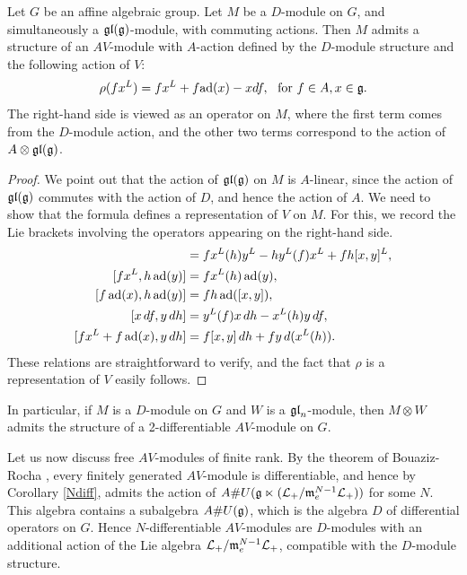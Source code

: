 \documentclass[12pt]{amsart}
\begin{document}

\begin{theorem}
[ChatGPT]
\label{twodiff}
Let $G$ be an affine algebraic group. Let $M$ be a $D$-module on $G$, and simultaneously a $\mathfrak{gl}(\mathfrak{g})$-module, with commuting actions. Then $M$ admits a structure of an $AV$-module with $A$-action defined by the $D$-module structure and the following action of $V$:
$$\rho(f x^L) = f x^L + f \ad(x) - x df, \ \ \text{for } f \in A, x \in \g.$$
The right-hand side is viewed as an operator on $M$, where the first term comes from the $D$-module action, and the other two terms correspond to the action of $A \otimes \mathfrak{gl}(\mathfrak{g})$.
\end{theorem}
\begin{proof}
We point out that the action of $\mathfrak{gl}(\mathfrak{g})$ on $M$ is $A$-linear, since the action of $\mathfrak{gl}(\mathfrak{g})$ commutes with the action of $D$, and hence the action of $A$. We need to show that the formula defines a representation of $V$ on $M$. For this, we record the Lie brackets involving the operators appearing on the right-hand side.
\begin{align*}
[f x^L, h y^L] &= f x^L(h) y^L - h y^L(f) x^L + fh [x,y]^L, \\
[f x^L, h \,\ad(y)] &= f x^L(h) \,\ad(y), \\
[f \,\ad(x), h \,\ad(y)] &= fh \, \ad([x,y]), \\
[x \,df, y \,dh] &= y^L(f) x \,dh - x^L(h) y \,df, \\
[f x^L + f \,\ad(x), y \,dh] &= f [x,y] \,dh + f y \,d(x^L(h)).
\end{align*}
These relations are straightforward to verify, and the fact that $\rho$ is a representation of $V$ easily follows.
\end{proof}

In particular, if $M$ is a $D$-module on $G$ and $W$ is a $\mathfrak{gl}_n$-module, then $M \otimes W$ admits the structure of a 2-differentiable $AV$-module on $G$. 

Let us now discuss free $AV$-modules of finite rank. By the theorem of Bouaziz-Rocha \cite{BR}, every finitely generated $AV$-module is differentiable, and hence by Corollary \ref{Ndiff}, admits the action of 
$A \# U(\mathfrak{g} \ltimes ({\mathcal L}_+ / \mathfrak{m}_e^{N-1} {\mathcal L}_+))$ for some $N$. This algebra contains a subalgebra 
$A \# U(\mathfrak{g})$, which is the algebra $D$ of differential operators on $G$. Hence $N$-differentiable $AV$-modules are $D$-modules with an additional action of the Lie algebra ${\mathcal L}_+ / \mathfrak{m}_e^{N-1} {\mathcal L}_+$, compatible with the $D$-module structure.
\end{document}
